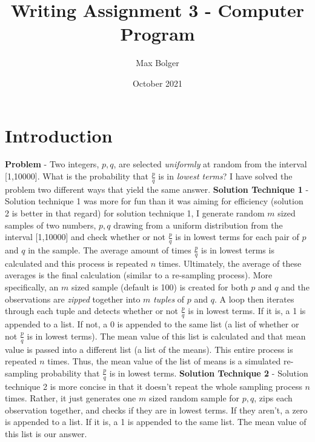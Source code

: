 \documentclass{article}
\title{Writing Assignment 3 - Computer Program}
\author{Max Bolger}
\date{October 2021}
\begin{document}
\maketitle

\section{Introduction}

\textbf{Problem} - Two integers, $p,q$, are selected \textit{uniformly} at random from the interval \textrm[1,10000]. What is the probability that $\frac{p}{q}$ is in \textit{lowest terms}? I have solved the problem two different ways that yield the same answer.
\newline
\newline
\textbf{Solution Technique 1} - Solution technique 1 was more for fun than it was aiming for efficiency (solution 2 is better in that regard) for solution technique 1, I generate random $m$ sized samples of two numbers, $p,q$ drawing from a uniform distribution from the interval \textrm[1,10000] and check whether or not $\frac{p}{q}$ is in lowest terms for each pair of $p$ and $q$ in the sample. The average amount of times $\frac{p}{q}$ is in lowest terms is calculated and this process is repeated $n$ times. Ultimately, the average of these averages is the final calculation (similar to a re-sampling process). More specifically, an $m$ sized sample (default is 100) is created for both $p$ and $q$ and the observations are \textit{zipped} together into $m$ \textit{tuples} of $p$ and $q$. A loop then iterates through each tuple and detects whether or not $\frac{p}{q}$ is in lowest terms. If it is, a 1 is appended to a list. If not, a 0 is appended to the same list (a list of whether or not $\frac{p}{q}$ is in lowest terms). The mean value of this list is calculated and that mean value is passed into a different list (a list of the means). This entire process is repeated $n$ times. Thus, the mean value of the list of means is a simulated re-sampling probability that $\frac{p}{q}$ is in lowest terms.
\newline
\newline
\textbf{Solution Technique 2} - Solution technique 2 is more concise in that it doesn't repeat the whole sampling process $n$ times. Rather, it just generates one $m$ sized random sample for $p,q$, zips each observation together, and checks if they are in lowest terms. If they aren't, a zero is appended to a list. If it is, a 1 is appended to the same list. The mean value of this list is our answer.
\end{document}
